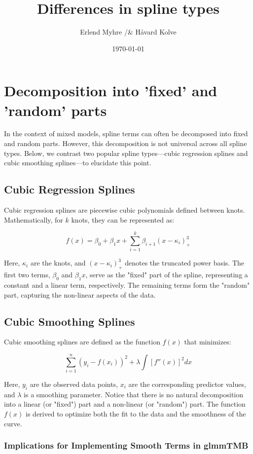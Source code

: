 \documentclass{article}
\title{Differences in spline types}
\author{Erlend Myhre /& Håvard Kolve}
\date{\today}
\begin{document}
\maketitle

\section{Decomposition into 'fixed' and 'random' parts}

In the context of mixed models, spline terms can often be decomposed into fixed and random parts. However, this decomposition is not universal across all spline types. Below, we contrast two popular spline types—cubic regression splines and cubic smoothing splines—to elucidate this point.

\subsection{Cubic Regression Splines}

Cubic regression splines are piecewise cubic polynomials defined between knots. Mathematically, for \(k\) knots, they can be represented as:

\[
f(x) = \beta_0 + \beta_1 x + \sum_{i=1}^{k} \beta_{i+1} (x - \kappa_i)^3_+ 
\]

Here, \(\kappa_i\) are the knots, and \((x - \kappa_i)^3_+\) denotes the truncated power basis. The first two terms, \(\beta_0\) and \(\beta_1 x\), serve as the "fixed" part of the spline, representing a constant and a linear term, respectively. The remaining terms form the "random" part, capturing the non-linear aspects of the data.

\subsection{Cubic Smoothing Splines}

Cubic smoothing splines are defined as the function \(f(x)\) that minimizes:

\[
\sum_{i=1}^{n} (y_i - f(x_i))^2 + \lambda \int [f''(x)]^2 dx
\]

Here, \(y_i\) are the observed data points, \(x_i\) are the corresponding predictor values, and \(\lambda\) is a smoothing parameter. Notice that there is no natural decomposition into a linear (or "fixed") part and a non-linear (or "random") part. The function \(f(x)\) is derived to optimize both the fit to the data and the smoothness of the curve.

\subsubsection{Implications for Implementing Smooth Terms in glmmTMB}
\end{document}
